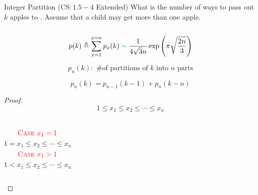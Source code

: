 
\begin{frame}{}
  \begin{exampleblock}{Integer Partition ($\text{CS}: 1.5-4$ Extended)}
    What is the number of ways to pass out $k$  apples to . 
    Assume that a child may get more than one apple.
  \end{exampleblock}

  \pause
  \begin{columns}
  \end{columns}

  \pause
  \vspace{0.80cm}
  \centerline{}

  \pause
  \begin{theorem}
    \[
      p(k) \triangleq \sum_{x=1}^{x=n} p_{x}(k) \;\textcolor{teal}{\sim}\; \frac {1} {4\sqrt{3} n} \exp\left({\pi \sqrt {\frac{2n}{3}}}\right)
    \]
  \end{theorem}
\end{frame}

\begin{frame}{}
  \[
    p_{n}(k): \text{ \# of partitions of $k$ into $n$ parts}
  \]

  \begin{theorem}
    \[
      p_{n}(k) = p_{n-1}(k-1) + p_{n}(k-n)
    \]
  \end{theorem}

  \pause
  \begin{proof}
    \[
      1 \le x_1 \le x_2 \le \cdots \le x_n
    \]

    \begin{columns}
	\[
	  \textcolor{red}{\text{\textsc{Case} } x_1 = 1}
	\]
	\[
	  1 = x_1 \le x_2 \le \cdots \le x_n
	\]
	\uncover<3->{
	  \[
	    \boxed{p_{n-1}(k-1)}
	  \]
	}
        \[
	  \textcolor{red}{\text{\textsc{Case} } x_1 > 1}
	\]
	\[
	  1 < x_1 \le x_2 \le \cdots \le x_n
	\]
	\uncover<4->{
	  \[
	    1 \le x_1-1 \le x_2-1 \le \cdots \le x_n-1
	  \]
	}
	\uncover<5->{
	  \[
	    \boxed{p_{n}(k-n)}
	  \]
	}
    \end{columns}
  \end{proof}
\end{frame}

